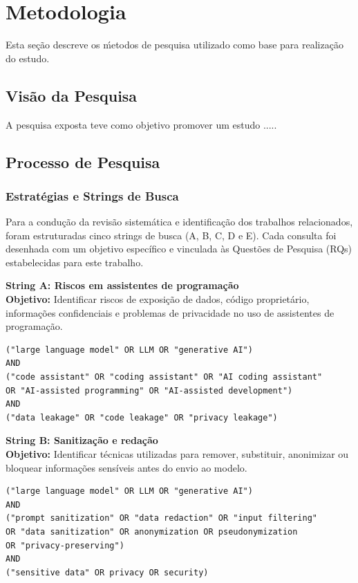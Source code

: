 \chapter{Metodologia}\label{chp:met}
Esta seção descreve os ḿetodos de pesquisa utilizado como base para realização do estudo. 

\section{Visão da Pesquisa}

A pesquisa exposta teve como objetivo promover um estudo .....

\section{Processo de Pesquisa}

\subsection{Estratégias e Strings de Busca}
\label{sec:strings_busca}

Para a condução da revisão sistemática e identificação dos trabalhos relacionados, foram estruturadas cinco strings de busca (A, B, C, D e E). Cada consulta foi desenhada com um objetivo específico e vinculada às Questões de Pesquisa (RQs) estabelecidas para este trabalho.

\vspace{0.3cm}
\noindent\textbf{String A: Riscos em assistentes de programação} \\
\textbf{Objetivo:} Identificar riscos de exposição de dados, código proprietário, informações confidenciais e problemas de privacidade no uso de assistentes de programação. \\
\begin{verbatim}
("large language model" OR LLM OR "generative AI")
AND
("code assistant" OR "coding assistant" OR "AI coding assistant"
OR "AI-assisted programming" OR "AI-assisted development")
AND
("data leakage" OR "code leakage" OR "privacy leakage")
\end{verbatim}

\vspace{0.3cm}
\noindent\textbf{String B: Sanitização e redação} \\
\textbf{Objetivo:} Identificar técnicas utilizadas para remover, substituir, anonimizar ou bloquear informações sensíveis antes do envio ao modelo. \\
\begin{verbatim}
("large language model" OR LLM OR "generative AI")
AND
("prompt sanitization" OR "data redaction" OR "input filtering"
OR "data sanitization" OR anonymization OR pseudonymization
OR "privacy-preserving")
AND
("sensitive data" OR privacy OR security)
\end{verbatim}

